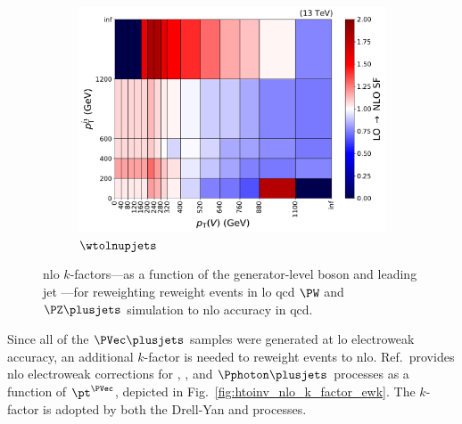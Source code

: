\begin{figure}[htbp]
    \begin{subfigure}[b]{0.45\textwidth}
        \includegraphics[width=\textwidth]{figures/nlo_k_factors/2D_wjets.pdf}
        \caption{$\wtolnupjets$}
    \end{subfigure}
    \caption[NLO $k$-factors---as a function of the generator-level boson \pt and leading jet \pt---for reweighting events in LO QCD $\PW$ and $\PZ \plusjets$ simulation to NLO accuracy in QCD]{\acrshort{nlo} $k$-factors---as a function of the generator-level boson \pt and leading jet \pt---for reweighting reweight events in \acrshort{lo} \acrshort{qcd} $\PW$ and $\PZ \plusjets$ simulation to \acrshort{nlo} accuracy in \acrshort{qcd}.}
    \label{fig:htoinv_nlo_k_factors_qcd}
\end{figure}

Since all of the $\PVec \plusjets$ samples were generated at \acrshort{lo} electroweak accuracy, an additional $k$-factor is needed to reweight events to \acrshort{nlo}. Ref.~provides \acrshort{nlo} electroweak corrections for \PW, \PZ, and $\Pphoton\plusjets$ processes as a function of $\pt^{\PVec}$, depicted in Fig.~\ref{fig:htoinv_nlo_k_factor_ewk}. The \PZ $k$-factor is adopted by both the Drell-Yan and \ztonunu processes.

